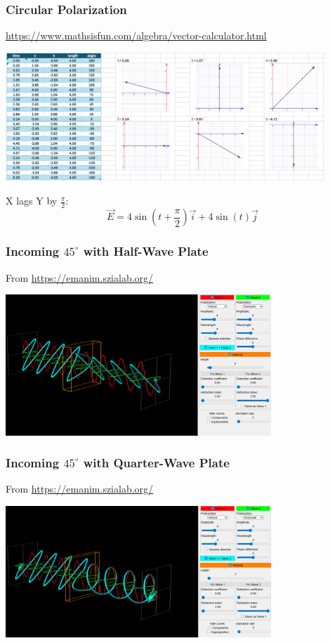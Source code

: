 \documentclass{beamer}
\begin{document}
\begin{frame}\frametitle{Circular Polarization}

\url{https://www.mathsisfun.com/algebra/vector-calculator.html}


\begin{center}
\includegraphics[width=12cm]{fig/pol2.jpg}
\end{center}

X lags Y by $\frac{\pi}{2}$:
\begin{equation}
\vec{E} = 4 \sin{(t + \frac{\pi}{2})} \vec{i} + 4 \sin{(t)} \vec{j}
\end{equation}

\end{frame}


\begin{frame}\frametitle{Incoming $45^\circ$ with Half-Wave Plate}
From \url{https://emanim.szialab.org/}

\begin{center}
\includegraphics[width=10cm]{fig/waveplate_45_2.png}
\end{center}
\end{frame}

\begin{frame}\frametitle{Incoming $45^\circ$ with Quarter-Wave Plate}
From \url{https://emanim.szialab.org/}

\begin{center}
\includegraphics[width=10cm]{fig/waveplate_45_4.png}
\end{center}
\end{frame}
\end{document}
